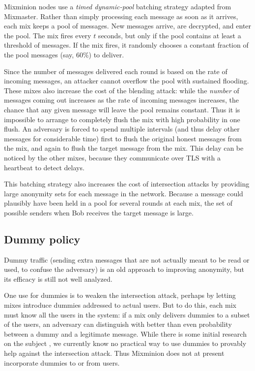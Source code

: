 \documentclass[11pt]{IEEEtran}
\begin{document}
Mixminion nodes use a \emph{timed dynamic-pool} batching strategy
\cite{batching-taxonomy} adapted from Mixmaster. Rather than simply
processing each message as soon as it arrives, each mix keeps a pool of
messages. New messages arrive, are decrypted, and enter the pool. The
mix fires every $t$ seconds, but only if the pool contains at least a
threshold of messages. If the mix fires, it randomly chooses a constant
fraction of the pool messages (say, 60\%) to deliver.

Since the number of messages delivered each round is based on the rate of
incoming messages, an attacker cannot overflow the pool with sustained
flooding. These mixes also increase the cost of the blending attack:
while the \emph{number} of messages coming out increases as the rate
of incoming messages increases, the chance that any given message will
leave the pool remains constant. Thus it is impossible to arrange to
completely flush the mix with high probability in one flush. An adversary
is forced to spend multiple intervals (and thus delay other messages
for considerable time) first to flush the original honest messages from
the mix, and again to flush the target message from the mix. This delay
can be noticed by the other mixes, because they communicate over TLS
with a heartbeat to detect delays.


This batching strategy also increases the cost of intersection attacks by
providing large anonymity sets for each message in the network. Because
a message could plausibly have been held in a pool for several rounds
at each mix, the set of possible senders when Bob receives the target
message is large.

\subsection{Dummy policy}

Dummy traffic (sending extra messages that are not actually meant to
be read or used, to confuse the adversary) is an old approach to
improving anonymity, but its efficacy is still not well analyzed.

One use for dummies is to weaken the intersection attack, perhaps by letting
mixes introduce dummies addressed to actual users. But to do this, each mix
must know all the users in the system: if a mix only delivers dummies to a
subset of the users, an adversary can distinguish with better than even
probability between a dummy and a legitimate message. While there is some
initial research on the subject \cite{langos02}, we currently know no
practical way to use dummies to provably help against the intersection
attack. Thus Mixminion does not at present incorporate dummies to or from
users.
\end{document}
